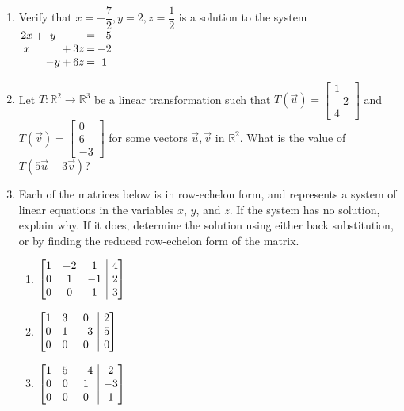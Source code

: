 \documentclass[12pt]{article}
\makeatletter
\newcommand{\points}[1]{\marginpar{\hspace{24pt}[#1]}}
\newcommand{\R}{\mathbb{R}}
\newcommand{\bbm}{\begin{bmatrix}}
\newcommand{\ebm}{\end{bmatrix}}
\newenvironment{amatrix}[1]{%
  \left[\begin{array}{@{}*{#1}{c}|c@{}}
}{%
  \end{array}\right]
}
\makeatother
\begin{document}
\begin{enumerate}
\vspace{2in}

\item Verify that $x=-\dfrac{7}{2}, y=2, z=\dfrac{1}{2}$ is a solution to the system \points{4} \hspace{12pt} $\arraycolsep=1pt
 \begin{array}{ccccccc}
  2x&+&y& & &=&-5\\x& & &+&3z&=&-2\\ & &-y&+&6z&=&1
 \end{array}
$


\vspace{2in}

\item Let $T:\R^2\to\R^3$ be a linear transformation such that $T(\vec{u}) = \bbm 1\\-2\\4\ebm$ and $T(\vec{v}) = \bbm 0\\6\\-3\ebm$ for some vectors $\vec{u}, \vec{v}$ in $\R^2$. What is the value of \points{4} $T(5\vec{u}-3\vec{v})$?

\newpage

\item Each of the matrices below is in row-echelon form, and represents a system of linear equations in the variables $x$, $y$, and $z$. If the system has no solution, explain why. If it does, determine the solution using either back substitution, or by finding the reduced row-echelon form of the matrix.\points{10}
\begin{enumerate}
 \item $\begin{amatrix}{3}1&-2&1&4\\0&1&-1&2\\0&0&1&3\end{amatrix}$ 

\vspace{2.25in}

 \item $\begin{amatrix}{3}1&3&0&2\\0&1&-3&5\\0&0&0&0\end{amatrix}$ 

\vspace{2.25in}

 \item $\begin{amatrix}{3}1&5&-4&2\\0&0&1&-3\\0&0&0&1\end{amatrix}$ 
\end{enumerate}
 \newpage


\end{enumerate}
\end{document}

